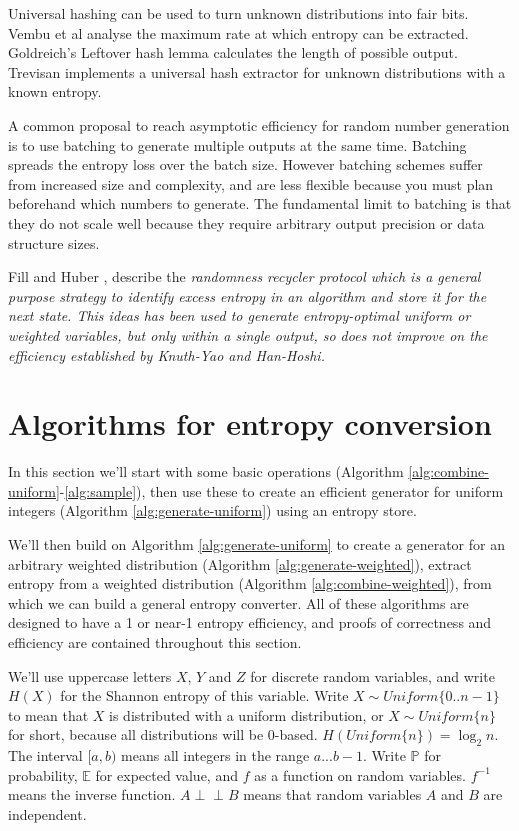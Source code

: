 \documentclass[12pt]{article}
\newcommand{\indep}{\perp\!\!\!\perp}
\begin{document}
Universal hashing can be used to turn unknown distributions into fair bits. Vembu et al \cite{vembu95} analyse the maximum rate at which entropy can be extracted. Goldreich's Leftover hash lemma \cite{goldreich2004foundations} calculates the length of possible output. Trevisan \cite{trevisan2001extractors} implements a universal hash extractor for unknown distributions with a known entropy. 

A common proposal to reach asymptotic efficiency for random number generation is to use batching to generate multiple outputs at the same time. \cite{bacher2017,han97,devroye86,Knuth1976TheCO,lumbroso2013optimal} Batching spreads the entropy loss over the batch size. However batching schemes suffer from increased size and complexity, and are less flexible because you must plan beforehand which numbers to generate. The fundamental limit to batching is that they do not scale well because they require arbitrary output precision or data structure sizes.

Fill and Huber \cite{fill2000randomness, huber2016perfect}, describe the \em randomness recycler \em protocol which is a general purpose strategy to identify excess entropy in an algorithm and store it for the next state. This ideas has been used to generate entropy-optimal uniform \cite{lumbroso2013optimal, huber2024optimal} or weighted \cite{huber2024optimal} variables, but only within a single output, so does not improve on the efficiency established by Knuth-Yao and Han-Hoshi.


\section{Algorithms for entropy conversion}

In this section we'll start with some basic operations (Algorithm \ref{alg:combine-uniform}-\ref{alg:sample}), then use these to create an efficient generator for uniform integers (Algorithm \ref{alg:generate-uniform}) using an entropy store.

We'll then build on Algorithm \ref{alg:generate-uniform} to create a generator for an arbitrary weighted distribution (Algorithm \ref{alg:generate-weighted}), extract entropy from a weighted distribution (Algorithm \ref{alg:combine-weighted}), from which we can build a general entropy converter. All of these algorithms are designed to have a 1 or near-1 entropy efficiency, and proofs of correctness and efficiency are contained throughout this section.

We'll use uppercase letters $X$, $Y$ and $Z$ for discrete random variables, and write $H(X)$ for the Shannon entropy of this variable. Write $X \sim Uniform\{0..n-1\}$ to mean that $X$ is distributed with a uniform distribution, or $X \sim Uniform\{n\}$ for short, because all distributions will be 0-based. $H(Uniform\{n\}) = \log_2n$. The interval $[a,b)$ means all integers in the range $a...b-1$. Write $\mathbb{P}$ for probability, $\mathbb{E}$ for expected value, and $f$ as a function on random variables. $f^{-1}$ means the inverse function. $A \indep B$ means that random variables $A$ and $B$ are independent.
\end{document}
